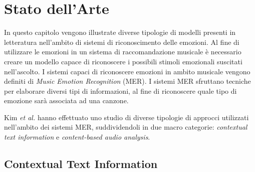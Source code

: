 \documentclass[11pt]{report}
\begin{document}
\chapter{Stato dell'Arte}

In questo capitolo vengono illustrate diverse tipologie di modelli presenti in letteratura nell'ambito di sistemi di riconoscimento delle emozioni. Al fine di utilizzare le emozioni in un sistema di raccomandazione musicale è necessario creare un modello capace di riconoscere i possibili stimoli emozionali suscitati nell'ascolto. I sistemi capaci di riconoscere emozioni in ambito musicale vengono definiti di \textit{Music Emotion Recognition} (MER). I sistemi MER sfruttano tecniche per elaborare diversi tipi di informazioni, al fine di riconoscere quale tipo di emozione sarà associata ad una canzone.


Kim \textit{et al.} \cite{kim2010music} hanno effettuato uno studio di diverse tipologie di approcci utilizzati nell'ambito dei sistemi MER, suddividendoli in due macro categorie: \textit{contextual text information} e \textit{content-based audio analysis}.

\section{Contextual Text Information}
\end{document}
